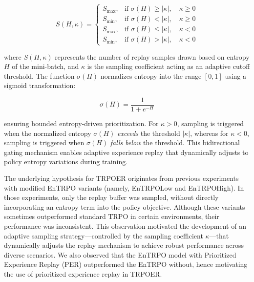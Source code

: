 \documentclass{svproc}
\begin{document}
\begin{equation}
S(H, \kappa) =
\begin{cases}
S_{\max}, & \text{if } \sigma(H) \geq \lvert \kappa \rvert, \quad \kappa \geq 0 \\
S_{\min}, & \text{if } \sigma(H) < \lvert \kappa \rvert, \quad \kappa \geq 0 \\
S_{\max}, & \text{if } \sigma(H) \leq \lvert \kappa \rvert, \quad \kappa < 0 \\
S_{\min}, & \text{if } \sigma(H) > \lvert \kappa \rvert, \quad \kappa < 0
\end{cases}
\end{equation}

\noindent where \( S(H, \kappa) \) represents the number of replay samples drawn based on entropy \( H \) of the mini-batch, and \( \kappa \) is the sampling coefficient acting as an adaptive cutoff threshold. The function \( \sigma(H) \) normalizes entropy into the range \( [0,1] \) using a sigmoid transformation:

\begin{equation}
\sigma(H) = \frac{1}{1 + e^{-H}}
\end{equation}

\noindent ensuring bounded entropy-driven prioritization. For \( \kappa > 0 \), sampling is triggered when the normalized entropy \( \sigma(H) \) {\it exceeds} the threshold \( \lvert \kappa \rvert \), whereas for \( \kappa < 0 \), sampling is triggered when \( \sigma(H) \) {\it falls below} the threshold. This bidirectional gating mechanism enables adaptive experience replay that dynamically adjusts to policy entropy variations during training.

The underlying hypothesis for TRPOER originates from previous experiments with modified EnTRPO variants (namely, EnTRPOLow and EnTRPOHigh). In those experiments, only the replay buffer was sampled, without directly incorporating an entropy term into the policy objective. Although these variants sometimes outperformed standard TRPO in certain environments, their performance was inconsistent. This observation motivated the development of an adaptive sampling strategy—controlled by the sampling coefficient \( \kappa \)—that dynamically adjusts the replay mechanism to achieve robust performance across diverse scenarios. We also observed that the EnTRPO model with Prioritized Experience Replay (PER) outperformed the EnTRPO without, hence motivating the use of prioritized experience replay in TRPOER.


\end{document}
